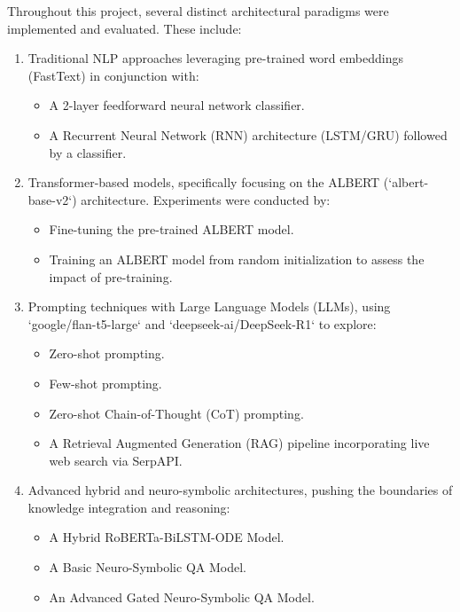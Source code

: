 \documentclass[10.5pt]{article}
\begin{document}
Throughout this project, several distinct architectural paradigms were implemented and evaluated. These include:
\begin{enumerate}
    \item Traditional NLP approaches leveraging pre-trained word embeddings (FastText) in conjunction with:
        \begin{itemize}
            \item A 2-layer feedforward neural network classifier.
            \item A Recurrent Neural Network (RNN) architecture (LSTM/GRU) followed by a classifier.
        \end{itemize}
    \item Transformer-based models, specifically focusing on the ALBERT (`albert-base-v2`) architecture. Experiments were conducted by:
        \begin{itemize}
            \item Fine-tuning the pre-trained ALBERT model.
            \item Training an ALBERT model from random initialization to assess the impact of pre-training.
        \end{itemize}
    \item Prompting techniques with Large Language Models (LLMs), using `google/flan-t5-large` and `deepseek-ai/DeepSeek-R1` to explore:
        \begin{itemize}
            \item Zero-shot prompting.
            \item Few-shot prompting.
            \item Zero-shot Chain-of-Thought (CoT) prompting.
            \item A Retrieval Augmented Generation (RAG) pipeline incorporating live web search via SerpAPI.
        \end{itemize}
    \item Advanced hybrid and neuro-symbolic architectures, pushing the boundaries of knowledge integration and reasoning:
        \begin{itemize}
            \item A Hybrid RoBERTa-BiLSTM-ODE Model.
            \item A Basic Neuro-Symbolic QA Model.
            \item An Advanced Gated Neuro-Symbolic QA Model.
        \end{itemize}
\end{enumerate}
\end{document}
